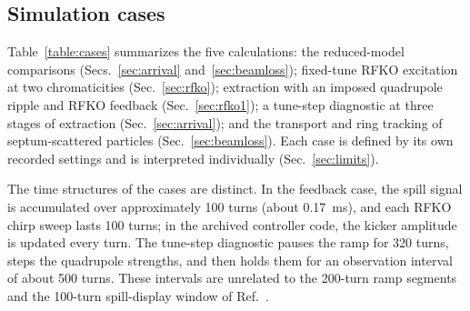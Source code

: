 \documentclass[a4paper,fleqn]{cas-sc}
\begin{document}
\subsection{\label{sec:cases}Simulation cases}

Table~\ref{table:cases} summarizes the five calculations: the reduced-model comparisons (Secs.~\ref{sec:arrival} and~\ref{sec:beamloss}); fixed-tune RFKO excitation at two chromaticities (Sec.~\ref{sec:rfko}); extraction with an imposed quadrupole ripple and RFKO feedback (Sec.~\ref{sec:rfko1}); a tune-step diagnostic at three stages of extraction (Sec.~\ref{sec:arrival}); and the transport and ring tracking of septum-scattered particles (Sec.~\ref{sec:beamloss}). Each case is defined by its own recorded settings and is interpreted individually (Sec.~\ref{sec:limits}).

The time structures of the cases are distinct. In the feedback case, the spill signal is accumulated over approximately 100 turns (about \SI{0.17}{\milli\second}), and each RFKO chirp sweep lasts 100 turns; in the archived controller code, the kicker amplitude is updated every turn. The tune-step diagnostic pauses the ramp for 320 turns, steps the quadrupole strengths, and then holds them for an observation interval of about 500 turns. These intervals are unrelated to the 200-turn ramp segments and the 100-turn spill-display window of Ref.~\cite{mu2e}.
\end{document}
